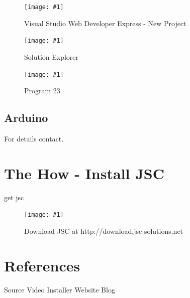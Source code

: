 \documentclass[12pt,leqno]{book}
\newcommand{\png}[1]{\texttt{[image: \#1]}}
\newcommand{\figpng}[2]{\begin{figure}[htb]\centering\png{#1}\caption{#2}\end{figure}}
\begin{document}
\figpng{Images/New_Project-2012-03-13_09.19.10}
{Visual Studio Web Developer Express - New Project}

\figpng{Images/SpiderModel_-_Microsoft_Visual_Studio-2012-03-14_15.39.19}
{Solution Explorer}

\figpng{Images/A_string_from_JavaScript._-_Google_Chrome-2012-03-14_16.12.04}
{Program 23}

\section{Arduino}
For details contact.

\chapter{The How - Install JSC}

get jsc

\figpng{Images/jsc_-_Google_Chrome-2012-03-14_14.33.04}
{Download JSC at http://download.jsc-solutions.net}


\chapter{References}

Source
Video
Installer
Website
Blog
\end{document}
